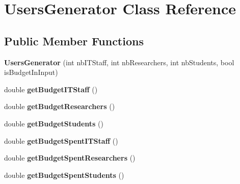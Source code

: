 \hypertarget{class_users_generator}{}\section{Users\+Generator Class Reference}
\label{class_users_generator}
\subsection*{Public Member Functions}
\begin{DoxyCompactItemize}
\item 
\mbox{\label{class_users_generator_aba9dc7527b95d02b466a9328bcfda268}} 
{\bfseries Users\+Generator} (int nb\+I\+T\+Staff, int nb\+Researchers, int nb\+Students, bool is\+Budget\+In\+Input)
\item 
\mbox{\label{class_users_generator_a5d6afb5f6fea2830431eb39e56bfb904}} 
double {\bfseries get\+Budget\+I\+T\+Staff} ()
\item 
\mbox{\label{class_users_generator_a5a6158b447c5c8b5bc48c771f127b893}} 
double {\bfseries get\+Budget\+Researchers} ()
\item 
\mbox{\label{class_users_generator_a42b91ad7272b8bb79a9f4aa5c3220480}} 
double {\bfseries get\+Budget\+Students} ()
\item 
\mbox{\label{class_users_generator_a90ed8eb2e6b3fd62abb97f5f4e1a6559}} 
double {\bfseries get\+Budget\+Spent\+I\+T\+Staff} ()
\item 
\mbox{\label{class_users_generator_acea0ae4a4aa518a2db58e6dde2bf44ce}} 
double {\bfseries get\+Budget\+Spent\+Researchers} ()
\item 
\mbox{\label{class_users_generator_ae6f2cb5583598a843029981d177a7c11}} 
double {\bfseries get\+Budget\+Spent\+Students} ()
\end{DoxyCompactItemize}
